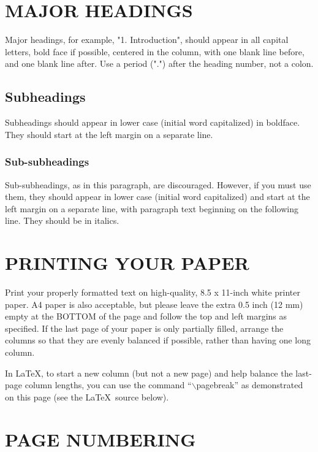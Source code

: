 \documentclass{article}
\begin{document}
\section{MAJOR HEADINGS}
\label{sec:majhead}

Major headings, for example, "1. Introduction", should appear in all capital
letters, bold face if possible, centered in the column, with one blank line
before, and one blank line after. Use a period (".") after the heading number,
not a colon.

\subsection{Subheadings}
\label{ssec:subhead}

Subheadings should appear in lower case (initial word capitalized) in
boldface.  They should start at the left margin on a separate line.
 
\subsubsection{Sub-subheadings}
\label{sssec:subsubhead}

Sub-subheadings, as in this paragraph, are discouraged. However, if you
must use them, they should appear in lower case (initial word
capitalized) and start at the left margin on a separate line, with paragraph
text beginning on the following line.  They should be in italics.

\section{PRINTING YOUR PAPER}
\label{sec:print}

Print your properly formatted text on high-quality, 8.5 x 11-inch white printer
paper. A4 paper is also acceptable, but please leave the extra 0.5 inch (12 mm)
empty at the BOTTOM of the page and follow the top and left margins as
specified.  If the last page of your paper is only partially filled, arrange
the columns so that they are evenly balanced if possible, rather than having
one long column.

In \LaTeX, to start a new column (but not a new page) and help balance the
last-page column lengths, you can use the command ``$\backslash$pagebreak'' as
demonstrated on this page (see the \LaTeX\ source below).

\section{PAGE NUMBERING}
\label{sec:page}
\end{document}
